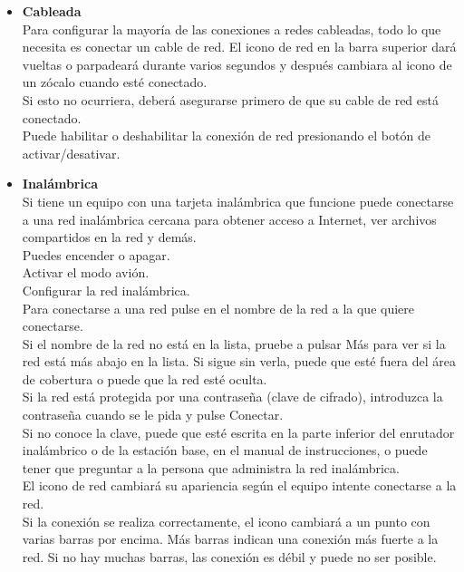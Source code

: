 \begin{itemize}
\item{\bf Cableada}\\
Para configurar la mayoría de las conexiones a redes cableadas, todo lo que necesita es conectar un cable de red. El icono de red en la barra superior dará vueltas o parpadeará durante varios segundos y después cambiara al icono de un zócalo cuando esté conectado.\\
Si esto no ocurriera, deberá asegurarse primero de que su cable de red está conectado.\\

Puede habilitar o deshabilitar la conexión de red presionando el botón de activar/desativar.
\item{\bf Inalámbrica}\\
Si tiene un equipo con una tarjeta inalámbrica que funcione puede conectarse a una red inalámbrica cercana para obtener acceso a Internet, ver archivos compartidos en la red y demás.\\

Puedes encender o apagar.\\
Activar el modo avión.\\
Configurar la red inalámbrica.\\

Para conectarse a una red pulse en el nombre de la red a la que quiere conectarse.\\
Si el nombre de la red no está en la lista, pruebe a pulsar Más para ver si la red está más abajo en la lista. Si sigue sin verla, puede que esté fuera del área de cobertura o puede que la red esté oculta.\\
Si la red está protegida por una contraseña (clave de cifrado), introduzca la contraseña cuando se le pida y pulse Conectar.\\
Si no conoce la clave, puede que esté escrita en la parte inferior del enrutador inalámbrico o de la estación base, en el manual de instrucciones, o puede tener que preguntar a la persona que administra la red inalámbrica.\\
El icono de red cambiará su apariencia según el equipo intente conectarse a la red.\\
Si la conexión se realiza correctamente, el icono cambiará a un punto con varias barras por encima. Más barras indican una conexión más fuerte a la red. Si no hay muchas barras, las conexión es débil y puede no ser posible.\\


\end{itemize}
